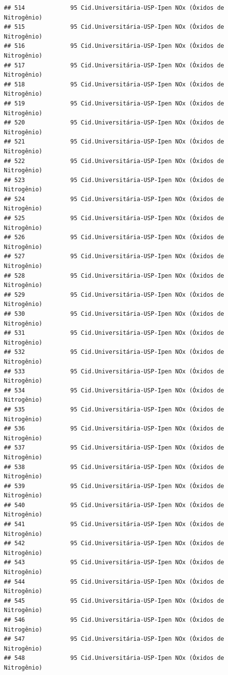 \documentclass[]{book}
\begin{document}
\begin{verbatim}
## 514             95 Cid.Universitária-USP-Ipen NOx (Óxidos de Nitrogênio)
## 515             95 Cid.Universitária-USP-Ipen NOx (Óxidos de Nitrogênio)
## 516             95 Cid.Universitária-USP-Ipen NOx (Óxidos de Nitrogênio)
## 517             95 Cid.Universitária-USP-Ipen NOx (Óxidos de Nitrogênio)
## 518             95 Cid.Universitária-USP-Ipen NOx (Óxidos de Nitrogênio)
## 519             95 Cid.Universitária-USP-Ipen NOx (Óxidos de Nitrogênio)
## 520             95 Cid.Universitária-USP-Ipen NOx (Óxidos de Nitrogênio)
## 521             95 Cid.Universitária-USP-Ipen NOx (Óxidos de Nitrogênio)
## 522             95 Cid.Universitária-USP-Ipen NOx (Óxidos de Nitrogênio)
## 523             95 Cid.Universitária-USP-Ipen NOx (Óxidos de Nitrogênio)
## 524             95 Cid.Universitária-USP-Ipen NOx (Óxidos de Nitrogênio)
## 525             95 Cid.Universitária-USP-Ipen NOx (Óxidos de Nitrogênio)
## 526             95 Cid.Universitária-USP-Ipen NOx (Óxidos de Nitrogênio)
## 527             95 Cid.Universitária-USP-Ipen NOx (Óxidos de Nitrogênio)
## 528             95 Cid.Universitária-USP-Ipen NOx (Óxidos de Nitrogênio)
## 529             95 Cid.Universitária-USP-Ipen NOx (Óxidos de Nitrogênio)
## 530             95 Cid.Universitária-USP-Ipen NOx (Óxidos de Nitrogênio)
## 531             95 Cid.Universitária-USP-Ipen NOx (Óxidos de Nitrogênio)
## 532             95 Cid.Universitária-USP-Ipen NOx (Óxidos de Nitrogênio)
## 533             95 Cid.Universitária-USP-Ipen NOx (Óxidos de Nitrogênio)
## 534             95 Cid.Universitária-USP-Ipen NOx (Óxidos de Nitrogênio)
## 535             95 Cid.Universitária-USP-Ipen NOx (Óxidos de Nitrogênio)
## 536             95 Cid.Universitária-USP-Ipen NOx (Óxidos de Nitrogênio)
## 537             95 Cid.Universitária-USP-Ipen NOx (Óxidos de Nitrogênio)
## 538             95 Cid.Universitária-USP-Ipen NOx (Óxidos de Nitrogênio)
## 539             95 Cid.Universitária-USP-Ipen NOx (Óxidos de Nitrogênio)
## 540             95 Cid.Universitária-USP-Ipen NOx (Óxidos de Nitrogênio)
## 541             95 Cid.Universitária-USP-Ipen NOx (Óxidos de Nitrogênio)
## 542             95 Cid.Universitária-USP-Ipen NOx (Óxidos de Nitrogênio)
## 543             95 Cid.Universitária-USP-Ipen NOx (Óxidos de Nitrogênio)
## 544             95 Cid.Universitária-USP-Ipen NOx (Óxidos de Nitrogênio)
## 545             95 Cid.Universitária-USP-Ipen NOx (Óxidos de Nitrogênio)
## 546             95 Cid.Universitária-USP-Ipen NOx (Óxidos de Nitrogênio)
## 547             95 Cid.Universitária-USP-Ipen NOx (Óxidos de Nitrogênio)
## 548             95 Cid.Universitária-USP-Ipen NOx (Óxidos de Nitrogênio)

\end{verbatim}
\end{document}
